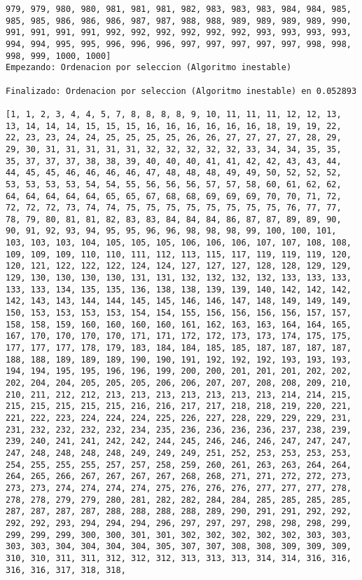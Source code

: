 \documentclass[11pt]{article}
\begin{document}
\begin{Verbatim}[commandchars=\\\{\}]
979, 979, 980, 980, 981, 981, 981, 982, 983, 983, 983, 984, 984, 985, 985, 985, 986, 986, 986, 987, 987, 988, 988, 989, 989, 989, 989, 990, 991, 991, 991, 991, 992, 992, 992, 992, 992, 992, 993, 993, 993, 993, 994, 994, 995, 995, 996, 996, 996, 997, 997, 997, 997, 997, 998, 998, 998, 999, 1000, 1000]
Empezando: Ordenacion por seleccion (Algoritmo inestable) 

Finalizado: Ordenacion por seleccion (Algoritmo inestable) en 0.052893 

[1, 1, 2, 3, 4, 4, 5, 7, 8, 8, 8, 8, 9, 10, 11, 11, 11, 12, 12, 13, 13, 14, 14, 14, 15, 15, 15, 16, 16, 16, 16, 16, 16, 18, 19, 19, 22, 22, 23, 23, 24, 24, 25, 25, 25, 25, 26, 26, 27, 27, 27, 27, 28, 29, 29, 30, 31, 31, 31, 31, 31, 32, 32, 32, 32, 32, 33, 34, 34, 35, 35, 35, 37, 37, 37, 38, 38, 39, 40, 40, 40, 41, 41, 42, 42, 43, 43, 44, 44, 45, 45, 46, 46, 46, 46, 47, 48, 48, 48, 49, 49, 50, 52, 52, 52, 53, 53, 53, 53, 54, 54, 55, 56, 56, 56, 57, 57, 58, 60, 61, 62, 62, 64, 64, 64, 64, 64, 65, 65, 67, 68, 68, 69, 69, 69, 70, 70, 71, 72, 72, 72, 72, 73, 74, 74, 75, 75, 75, 75, 75, 75, 75, 75, 76, 77, 77, 78, 79, 80, 81, 81, 82, 83, 83, 84, 84, 84, 86, 87, 87, 89, 89, 90, 90, 91, 92, 93, 94, 95, 95, 96, 96, 98, 98, 98, 99, 100, 100, 101, 103, 103, 103, 104, 105, 105, 105, 106, 106, 106, 107, 107, 108, 108, 109, 109, 109, 110, 110, 111, 112, 113, 115, 117, 119, 119, 119, 120, 120, 121, 122, 122, 122, 124, 124, 127, 127, 127, 128, 128, 129, 129, 129, 130, 130, 130, 130, 131, 131, 132, 132, 132, 132, 133, 133, 133, 133, 133, 134, 135, 135, 136, 138, 138, 139, 139, 140, 142, 142, 142, 142, 143, 143, 144, 144, 145, 145, 146, 146, 147, 148, 149, 149, 149, 150, 153, 153, 153, 153, 154, 154, 155, 156, 156, 156, 156, 157, 157, 158, 158, 159, 160, 160, 160, 160, 161, 162, 163, 163, 164, 164, 165, 167, 170, 170, 170, 170, 171, 171, 172, 172, 173, 173, 174, 175, 175, 177, 177, 177, 178, 179, 183, 184, 184, 185, 185, 187, 187, 187, 187, 188, 188, 189, 189, 189, 190, 190, 191, 192, 192, 192, 193, 193, 193, 194, 194, 195, 195, 196, 196, 199, 200, 200, 201, 201, 201, 202, 202, 202, 204, 204, 205, 205, 205, 206, 206, 207, 207, 208, 208, 209, 210, 210, 211, 212, 212, 213, 213, 213, 213, 213, 213, 213, 214, 214, 215, 215, 215, 215, 215, 215, 216, 216, 217, 217, 218, 218, 219, 220, 221, 221, 222, 223, 224, 224, 224, 225, 226, 227, 228, 229, 229, 229, 231, 231, 232, 232, 232, 232, 234, 235, 236, 236, 236, 236, 237, 238, 239, 239, 240, 241, 241, 242, 242, 244, 245, 246, 246, 246, 247, 247, 247, 247, 248, 248, 248, 248, 249, 249, 249, 251, 252, 253, 253, 253, 253, 254, 255, 255, 255, 257, 257, 258, 259, 260, 261, 263, 263, 264, 264, 264, 265, 266, 267, 267, 267, 267, 268, 268, 271, 271, 272, 272, 273, 273, 273, 274, 274, 274, 274, 275, 276, 276, 276, 277, 277, 277, 278, 278, 278, 279, 279, 280, 281, 282, 282, 284, 284, 285, 285, 285, 285, 287, 287, 287, 287, 288, 288, 288, 288, 289, 290, 291, 291, 292, 292, 292, 292, 293, 294, 294, 294, 296, 297, 297, 297, 298, 298, 298, 299, 299, 299, 299, 300, 300, 301, 301, 302, 302, 302, 302, 302, 303, 303, 303, 303, 304, 304, 304, 304, 305, 307, 307, 308, 308, 309, 309, 309, 310, 310, 311, 311, 312, 312, 312, 313, 313, 313, 314, 314, 316, 316, 316, 316, 317, 318, 318, 
\end{Verbatim}
\end{document}
